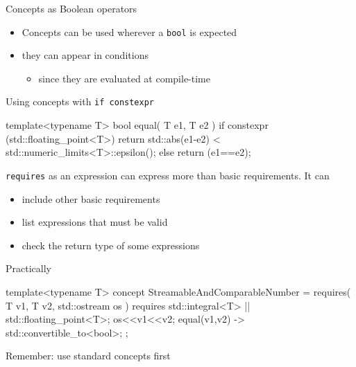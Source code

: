 \begin{frame}[fragile]
    \begin{block}{Concepts as Boolean operators}
      \begin{itemize}
        \item Concepts can be used wherever a \texttt{bool} is expected
        \item they can appear in  conditions
          \begin{itemize}
          \item since they are evaluated at compile-time
          \end{itemize}
      \end{itemize}
    \end{block}
    \begin{exampleblock}{Using concepts with \texttt{if constexpr}}
      \small
      \begin{cppcode*}{}
      template<typename T>
      bool equal( T e1, T e2 )
      {
        if constexpr (std::floating_point<T>) {
          return std::abs(e1-e2)
                   < std::numeric_limits<T>::epsilon();
        } else {
          return (e1==e2);
        }
      }
      \end{cppcode*}
    \end{exampleblock}
\end{frame}

\begin{frame}[fragile]
    \begin{block}{\texttt{requires} as an expression}
         can express more than basic requirements. It can
        \begin{itemize}
            \item include other basic requirements
            \item list expressions that must be valid
            \item check the return type of some expressions
        \end{itemize}
    \end{block}
    \begin{exampleblock}{Practically}
      \small
      \begin{cppcode*}{}
      template<typename T>
      concept StreamableAndComparableNumber =
      requires( T v1, T v2, std::ostream os ) {
        requires std::integral<T> || std::floating_point<T>;
        os<<v1<<v2;
        { equal(v1,v2) } -> std::convertible_to<bool>;
      };
      \end{cppcode*}
    \end{exampleblock}
    \begin{block}{}
      Remember: use standard concepts first
    \end{block}
\end{frame}

